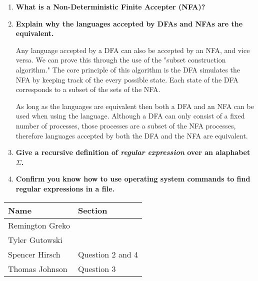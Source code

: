 \documentclass{article}
\begin{document}
\begin{enumerate}
    \medskip

    \item \textbf{What is a Non-Deterministic Finite Accepter (NFA)?}
    
    \medskip


    \medskip

    \item \textbf{Explain why the languages accepted by DFAs and NFAs are the equivalent.}
    
    \medskip

    \-\hspace{0.5cm} Any language accepted by a DFA can also be accepted by an NFA,
     and vice versa. We can prove this through the use of the "subset construction
     algorithm." The core principle of this algorithm is the DFA simulates the NFA
     by keeping track of the every possible state. Each state of the DFA corresponds
     to a subset of the sets of the NFA.

     \-\hspace{0.5cm} As long as the languages are equivalent then both a DFA and an 
     NFA can be used when using the language. Although a DFA can only consist of a 
     fixed number of processes, those processes are a subset of the NFA processes,
     therefore languages accepted by both the DFA and the NFA are equivalent.

    \medskip

    \item \textbf{Give a recursive definition of \textit{regular expression} over
            an alaphabet $\Sigma$.}

    \medskip


    \medskip

    \item \textbf{Confirm you know how to use operating system commands to find
            regular expressions in a file.}

    \medskip


    \medskip
\end{enumerate}

\pagebreak

\begin{center}
    \begin{tabular}{|p{3cm}|p{6cm}|}
        \hline
        \textbf{Name} & \textbf{Section} \\
        \hline
        Remington Greko &  \\
        \hline
        Tyler Gutowski &  \\
        \hline
        Spencer Hirsch &  Question 2 and 4\\
        \hline
        Thomas Johnson &  Question 3\\
        \hline
    \end{tabular}
\end{center}
\end{document}
